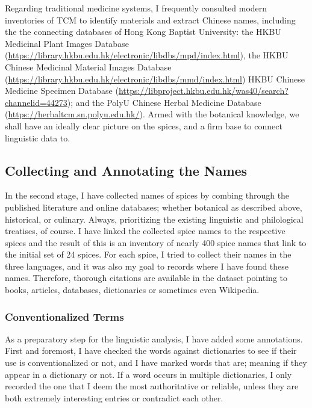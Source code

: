 Regarding traditional medicine systems, I frequently consulted modern inventories of \gls{TCM} to identify materials and extract Chinese names, including the the connecting databases of Hong Kong Baptist University: the HKBU Medicinal Plant Images Database (\url{https://library.hkbu.edu.hk/electronic/libdbs/mpd/index.html}), the HKBU Chinese Medicinal Material Images Database (\url{https://library.hkbu.edu.hk/electronic/libdbs/mmd/index.html}) HKBU Chinese Medicine Specimen Database (\url{https://libproject.hkbu.edu.hk/was40/search?channelid=44273}); and the PolyU Chinese Herbal Medicine Database (\url{https://herbaltcm.sn.polyu.edu.hk/}). Armed with the botanical knowledge, we shall have an ideally clear picture on the spices, and a firm base to connect linguistic data to.


\subsection{Collecting and Annotating the Names}

In the second stage, I have collected names of spices by combing through the published literature and online databases; whether botanical as described above, historical, or culinary. Always, prioritizing the existing linguistic and philological treatises, of course. I have linked the collected spice names to the respective spices and the result of this is an inventory of nearly 400 spice names that link to the initial set of 24 spices. For each spice, I tried to collect their names in the three languages, and it was also my goal to records where I have found these names. Therefore, thorough citations are available in the dataset pointing to books, articles, databases, dictionaries or sometimes even Wikipedia.

\subsubsection{Conventionalized Terms}

As a preparatory step for the linguistic analysis, I have added some annotations. First and foremost, I have checked the words against dictionaries to see if their use is conventionalized or not, and I have marked words that are; meaning if they appear in a dictionary or not. If a word occurs in multiple dictionaries, I only recorded the one that I deem the most authoritative or reliable, unless they are both extremely interesting entries or contradict each other. 

